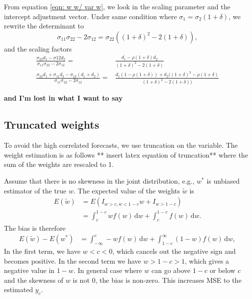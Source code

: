\documentclass[]{article}
\begin{document}
From equation \ref{eqn: w w/ var w}, we look in the scaling parameter
and the intercept adjustment vector. Under same condition where
\(\sigma_1 =\sigma_2 (1 + \delta)\), we rewrite the determinant to
\begin{equation}
\sigma_{11}\sigma_{22} - 2\sigma_{12} = \sigma_22 ((1+\delta)^2 - 2 (1+\delta)),
\end{equation} and the scaling factors \begin{equation}
\label{eqn: scaling factors}
\begin{aligned}
\frac{\sigma_{22} d_1 - \sigma{12}d_2}{\sigma_{11}\sigma_{22} - 2\sigma_{12}} =& \frac{d_1-\rho(1+\delta) d_2}{(1+\delta)^2 - 2 (1+\delta)}\\
\frac{\sigma_{22} d_1 + \sigma_{11} d_2 -\sigma_{12} (d_1 + d_2)}{\sigma_{11}\sigma_{22} - 2\sigma_{12}} =& \frac{d_1(1- \rho(1+\delta)) + d_2 ((1+\delta)^2-\rho(1+\delta)} {(1+\delta)^2 - 2 (1+\delta))}
\end{aligned}
\end{equation}

\textbf{and I'm lost in what I want to say}

\hypertarget{truncated-weights}{%
\subsection{Truncated weights}\label{truncated-weights}}

To avoid the high correlated forecasts, we use truncation on the
variable. The weight estimation is as follows ** insert latex equation
of truncation** where the sum of the weights are rescaled to 1.

Assume that there is no skewness in the joint distribution, e.g.,
\(w^*\) is unbiased estimator of the true \(w\). The expected value of
the weights \(\tilde{w}\) is \begin{equation}
\label{eqn: E w trunc}
\begin{aligned}
E(\tilde{w}) &= E(I_{w>c, w<1-c}w + I_{w>1-c})\\
&=\int_c^{1-c} wf(w)\,\mathrm{d}w+\int_c^{1-c} f(w)\,\mathrm{d}w.
\end{aligned}
\end{equation} The bias is therefore \begin{equation}
\label{eqn: bias w trunc}
\begin{aligned}
E(\tilde{w}) - E(w^*) &= \int_{-\infty}^{c} -wf(w)\,\mathrm{d}w+\int_{1-c}^{\infty} (1-w)f(w)\,\mathrm{d}w,
\end{aligned}
\end{equation} In the first term, we have \(w<c<0\), which cancels out
the negative sign and becomes positive. In the second term we have
\(w>1-c>1\), which gives a negative value in \(1-w\). In general case
where \(w\) can go above \(1-c\) or below \(c\) and the skewness of
\(w\) is not 0, the bias is non-zero. This increases MSE to the
estimated \(y_c\).
\end{document}
